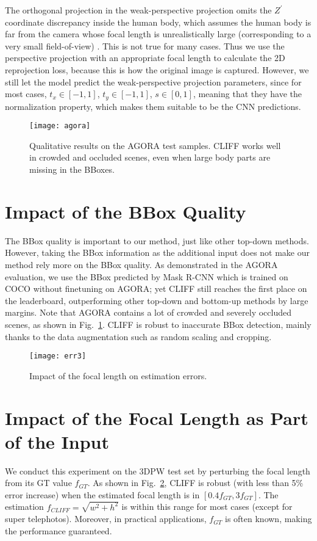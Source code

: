 \documentclass[runningheads]{llncs}
\begin{document}
The orthogonal projection in the weak-perspective projection omits the $Z^{'}$ coordinate discrepancy inside the human body, which assumes the human body is far from the camera whose focal length is unrealistically large (corresponding to a very small field-of-view) \cite{kanazawa2018end,kolotouros2019learning}.
This is not true for many cases.
Thus we use the perspective projection with an appropriate focal length to calculate the 2D reprojection loss, because this is how the original image is captured.
However, we still let the model predict the weak-perspective projection parameters, since for most cases, $t_x \in [-1, 1]$, $t_y \in [-1, 1]$, $s \in [0, 1]$, meaning that they have the normalization property, which makes them suitable to be the CNN predictions.



\begin{figure}[t]
	\centering
	\texttt{[image: agora]}
	\caption {Qualitative results on the AGORA test samples. CLIFF works well in crowded and occluded scenes, even when large body parts are missing in the BBoxes.}
	\label{fig:agora}
\end{figure}

\section{Impact of the BBox Quality}
The BBox quality is important to our method, just like other top-down methods.
However, taking the BBox information as the additional input does not make our method rely more on the BBox quality.
As demonstrated in the AGORA evaluation, we use the BBox predicted by Mask R-CNN which is trained on COCO without finetuning on AGORA;
yet CLIFF still reaches the first place on the leaderboard, outperforming other top-down and bottom-up methods by large margins.
Note that AGORA contains a lot of crowded and severely occluded scenes, as shown in Fig.~\ref{fig:agora}.
CLIFF is robust to inaccurate BBox detection, mainly thanks to the data augmentation such as random scaling and cropping.

\begin{figure}[t]
	\centering
	\texttt{[image: err3]}
	\caption {Impact of the focal length on estimation errors.}
	\label{fig:focal_l}
\end{figure}

\section{Impact of the Focal Length as Part of the Input}
We conduct this experiment on the 3DPW test set by perturbing the focal length from its GT value $f_{GT}$.
As shown in Fig.~\ref{fig:focal_l}, CLIFF is robust (with less than 5\% error increase) when the estimated focal length is in $[0.4f_{GT}, 3f_{GT}]$.
The estimation $f_{CLIFF} = \sqrt{w^2 + h^2}$ is within this range for most cases (except for super telephotos).
Moreover, in practical applications, $f_{GT}$ is often known, making the performance guaranteed.
\end{document}
